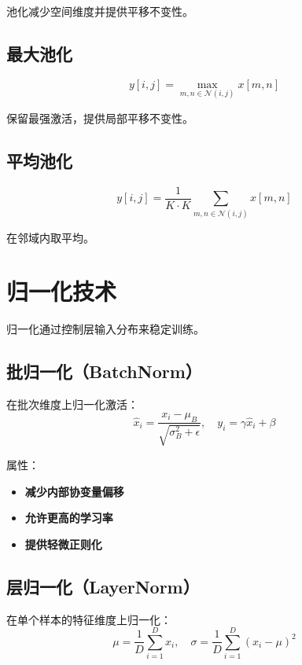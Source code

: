 池化减少空间维度并提供平移不变性。

\subsection{最大池化}

\begin{equation}
y[i,j] = \max_{m,n \in \mathcal{N}(i,j)} x[m,n]
\end{equation}

保留最强激活，提供局部平移不变性。

\subsection{平均池化}

\begin{equation}
y[i,j] = \frac{1}{K \cdot K}\sum_{m,n \in \mathcal{N}(i,j)} x[m,n]
\end{equation}

在邻域内取平均。

\section{归一化技术}

归一化通过控制层输入分布来稳定训练。

\subsection{批归一化（BatchNorm）}

在批次维度上归一化激活：
\begin{equation}
\hat{x}_i = \frac{x_i - \mu_B}{\sqrt{\sigma_B^2 + \epsilon}}, \quad y_i = \gamma \hat{x}_i + \beta
\end{equation}

属性：
\begin{itemize}
    \item \textbf{减少内部协变量偏移}
    \item \textbf{允许更高的学习率}
    \item \textbf{提供轻微正则化}
\end{itemize}

\subsection{层归一化（LayerNorm）}

在单个样本的特征维度上归一化：
\begin{equation}
\mu = \frac{1}{D}\sum_{i=1}^{D} x_i, \quad \sigma = \frac{1}{D}\sum_{i=1}^{D}(x_i - \mu)^2
\end{equation}

